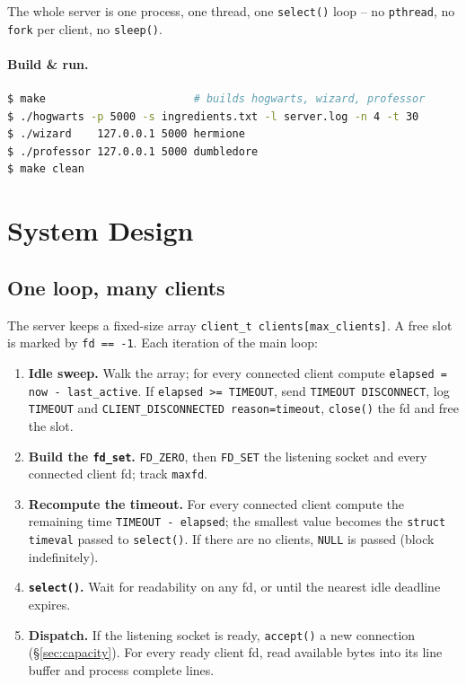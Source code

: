 \documentclass[11pt,a4paper]{article}
\begin{document}
\begin{remark}
The whole server is one process, one thread, one \texttt{select()} loop --
no \texttt{pthread}, no \texttt{fork} per client, no \texttt{sleep()}.
\end{remark}

\paragraph{Build \& run.}
\begin{lstlisting}[language=bash]
$ make                       # builds hogwarts, wizard, professor
$ ./hogwarts -p 5000 -s ingredients.txt -l server.log -n 4 -t 30
$ ./wizard    127.0.0.1 5000 hermione
$ ./professor 127.0.0.1 5000 dumbledore
$ make clean
\end{lstlisting}

\section{System Design}

\subsection{One loop, many clients}
The server keeps a fixed-size array \texttt{client\_t clients[max\_clients]}.
A free slot is marked by \texttt{fd == -1}. Each iteration of the main loop:

\begin{enumerate}[nosep]
  \item \textbf{Idle sweep.} Walk the array; for every connected client compute
        \texttt{elapsed = now - last\_active}. If \texttt{elapsed >= TIMEOUT},
        send \texttt{TIMEOUT DISCONNECT}, log \texttt{TIMEOUT} and
        \texttt{CLIENT\_DISCONNECTED reason=timeout}, \texttt{close()} the fd
        and free the slot.
  \item \textbf{Build the \texttt{fd\_set}.} \texttt{FD\_ZERO}, then
        \texttt{FD\_SET} the listening socket and every connected client fd;
        track \texttt{maxfd}.
  \item \textbf{Recompute the timeout.} For every connected client compute the
        remaining time \texttt{TIMEOUT - elapsed}; the smallest value becomes
        the \texttt{struct timeval} passed to \texttt{select()}. If there are
        no clients, \texttt{NULL} is passed (block indefinitely).
  \item \textbf{\texttt{select()}.} Wait for readability on any fd, or until the
        nearest idle deadline expires.
  \item \textbf{Dispatch.} If the listening socket is ready, \texttt{accept()} a
        new connection (\S\ref{sec:capacity}). For every ready client fd, read
        available bytes into its line buffer and process complete lines.
\end{enumerate}
\end{document}
